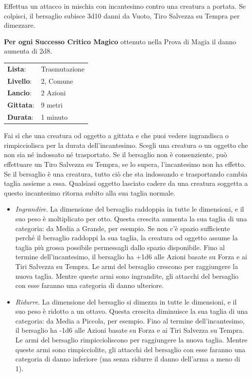 \begin{multicols}{2}
Effettua un attacco in mischia con incantesimo contro una creatura a portata. Se colpisci, il bersaglio subisce 3d10 danni da Vuoto, Tiro Salvezza su Tempra per dimezzare.

\textbf{Per ogni Successo Critico Magico} ottenuto nella Prova di Magia il danno aumenta di 2d8.

\noindent\begin{tabularx}{\linewidth}{p{1.3cm}X}
	\rowcolor{gray!20}\textbf{Lista}: & Trasmutazione \\
	\textbf{Livello}: & 2, Comune \\
	\rowcolor{gray!20}\textbf{Lancio}: & 2 Azioni \\
	\textbf{Gittata}: & 9 metri \\
	\rowcolor{gray!20}\textbf{Durata}: & 1 minuto \\
\end{tabularx}\smallskip

Fai sì che una creatura od oggetto a gittata e che puoi vedere ingrandisca o rimpicciolisca per la durata dell'incantesimo. Scegli una creatura o un oggetto che non sia né indossato né trasportato. Se il bersaglio non è consenziente, può effettuare un Tiro Salvezza su Tempra, se lo supera, l'incantesimo non ha effetto. Se il bersaglio è una creatura, tutto ciò che sta indossando e trasportando cambia taglia assieme a essa. Qualsiasi oggetto lasciato cadere da una creatura soggetta a questo incantesimo ritorna subito alla sua taglia normale.

\begin{itemize}[leftmargin=*] \setlength{\itemsep}{0pt}
	\item \emph{Ingrandire}. La dimensione del bersaglio raddoppia in tutte le dimensioni, e il suo peso è moltiplicato per otto. Questa crescita aumenta la sua taglia di una categoria: da Media a Grande, per esempio. Se non c'è spazio sufficiente perché il bersaglio raddoppi la sua taglia, la creatura od oggetto assume la taglia più grossa possibile permessagli dallo spazio disponibile. Fino al termine dell'incantesimo, il bersaglio ha +1d6 alle Azioni basate su Forza e ai Tiri Salvezza su Tempra. Le armi del bersaglio crescono per raggiungere la nuova taglia. Mentre queste armi sono ingrandite, gli attacchi del bersaglio con esse faranno una categoria di danno ulteriore.
	\item \emph{Ridurre}. La dimensione del bersaglio si dimezza in tutte le dimensioni, e il suo peso è ridotto a un ottavo. Questa crescita diminuisce la sua taglia di una categoria: da Media a Piccola, per esempio. Fino al termine dell'incantesimo, il bersaglio ha -1d6 alle Azioni basate su Forza e ai Tiri Salvezza su Tempra. Le armi del bersaglio rimpiccioliscono per raggiungere la nuova taglia. Mentre queste armi sono rimpicciolite, gli attacchi del bersaglio con esse faranno una categoria di danno inferiore (ma senza ridurre il danno dell'arma a meno di 1).
\end{itemize}


\end{multicols}
